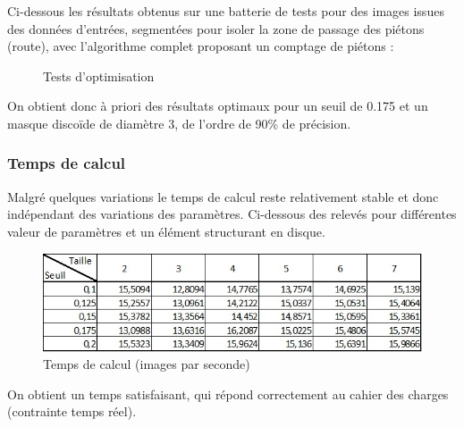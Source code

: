 \documentclass{article}
\begin{document}
	Ci-dessous les résultats obtenus sur une batterie de tests pour des images issues des données d'entrées, segmentées pour isoler la zone de passage des piétons (route), avec l'algorithme complet proposant un comptage de piétons :
	
	\begin{figure}[h]
		\centering
		\hfill
		\caption{Tests d'optimisation}
	\end{figure}
	
	On obtient donc à priori des résultats optimaux pour un seuil de 0.175 et un masque discoïde de diamètre 3, de l'ordre de 90\% de précision.
	
	\subsubsection{Temps de calcul}
	Malgré quelques variations le temps de calcul reste relativement stable et donc indépendant des variations des paramètres. Ci-dessous des relevés pour différentes valeur de paramètres et un élément structurant en disque.
	
	\begin{figure}[h]
		\begin{center}			
			\includegraphics[scale=0.5]{Img/TPSDISK}
		\end{center}
		\caption{Temps de calcul (images par seconde)}
	\end{figure}
	On obtient un temps satisfaisant, qui répond correctement au cahier des charges (contrainte temps réel).
	
\end{document}
